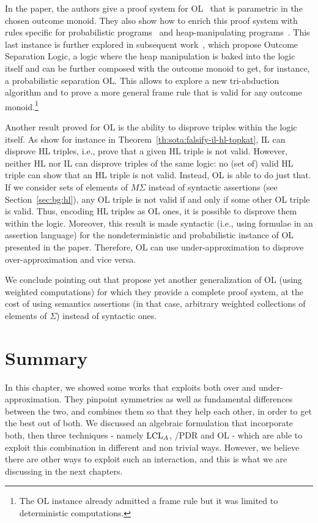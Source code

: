 In the paper, the authors give a proof system for OL~\cite[Figure~4]{ZDS23} that is parametric in the chosen outcome monoid. They also show how to enrich this proof system with rules specific for probabilistic programs~\cite[Figure~7]{ZDS23} and heap-manipulating programs~\cite[Figure~6]{ZDS23}. This last instance is further explored in subsequent work~\cite{ZSS24}, which propose Outcome Separation Logic, a logic where the heap manipulation is baked into the logic itself and can be further composed with the outcome monoid to get, for instance, a probabilistic separation OL. This allows to explore a new tri-abduction algorithm and to prove a more general frame rule that is valid for any outcome monoid.\footnote{The OL instance already admitted a frame rule but it was limited to deterministic computations.}

Another result proved for OL is the ability to disprove triples within the logic itself. As show for instance in Theorem~\ref{th:sota:falsify-il-hl-topkat}, IL can disprove HL triples, i.e., prove that a given HL triple is not valid. However, neither HL nor IL can disprove triples of the same logic: no (set of) valid HL triple can show that an HL triple is not valid. Instead, OL is able to do just that. If we consider sets of elements of $M \Sigma$ instead of syntactic assertions (see Section~\ref{sec:bg:hl}), any OL triple is not valid if and only if some other OL triple is valid. Thus, encoding HL triples as OL ones, it is possible to disprove them within the logic. Moreover, this result is made syntactic (i.e., using formulae in an assertion language) for the nondeterministic and probabilistic instance of OL presented in the paper. Therefore, OL can use under-approximation to disprove over-approximation and vice versa.

We conclude pointing out that \cite{Zilberstein24} propose yet another generalization of OL (using weighted computations) for which they provide a complete proof system, at the cost of using semantics assertions (in that case, arbitrary weighted collections of elements of $\Sigma$) instead of syntactic ones.

\section{Summary}
In this chapter, we showed some works that exploits both over and under-approximation. They pinpoint symmetries as well as fundamental differences between the two, and combines them so that they help each other, in order to get the best out of both. We discussed an algebraic formulation that incorporate both, then three techniques - namely $\text{LCL}_A$, /PDR and OL - which are able to exploit this combination in different and non trivial ways. However, we believe there are other ways to exploit such an interaction, and this is what we are discussing in the next chapters.
